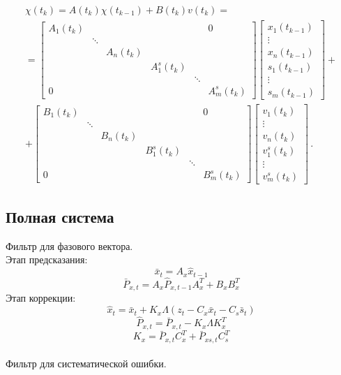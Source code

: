 \begin{multline}
  \chi(t_k) = A(t_k) \chi(t_{k - 1}) + B(t_k) v(t_k) 
  = \\ = 
  \begin{bmatrix}
    A_1(t_k) & & & & & 0 \\
     & \ddots & & & & \\
     & & A_n(t_k) & & & \\ 
    & & & A^s_1(t_k) & & \\
    & & & & \ddots & \\
    0 & & & & & A^s_m(t_k) 
  \end{bmatrix}
  \begin{bmatrix}
    x_1(t_{k - 1}) \\ \vdots \\ x_n(t_{k - 1}) \\ 
    s_1(t_{k - 1}) \\ \vdots \\ s_m(t_{k - 1}) 
  \end{bmatrix}
  + \\ + 
  \begin{bmatrix}
    B_1(t_k) & & & & & 0 \\
     & \ddots & & & & \\
     & & B_n(t_k) & & & \\ 
    & & & B^s_1(t_k) & & \\
    & & & & \ddots & \\
    0 & & & & & B^s_m(t_k) 
  \end{bmatrix}
  \begin{bmatrix}
    v_1(t_k) \\ \vdots \\ v_n(t_k) \\ 
    v^s_1(t_k) \\ \vdots \\ v^s_m(t_k) 
  \end{bmatrix}
  \,.
  \label{Bedin:eq:x-s-big-dynamics}
\end{multline}

\subsection{Полная система}
Фильтр для фазового вектора. \\

\noindent Этап предсказания:
\[\bar{x}_{t} = A_{x}\hat{x}_{t-1} \]
\[\bar{P}_{x,t} = A_{x}\hat{P}_{x,t-1}A_{x}^T + B_{x}B_{x}^T\]
Этап коррекции:
\[\hat{x}_{t} = \bar{x}_{t} + K_{x}\Lambda(z_{t} - C_{x}\bar{x}_{t} - C_{s}\bar{s}_{t})\]
\[\hat{P}_{x,t} = \bar{P}_{x,t} - K_{x}\Lambda K_{x}^T\]
\[K_{x} = \bar{P}_{x,t}C_{x}^T + \bar{P}_{xs,t}C_{s}^T \] \\
\noindent Фильтр для систематической ошибки. \\


